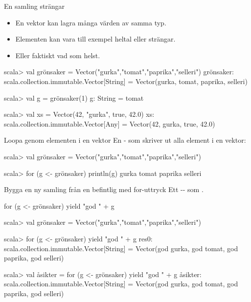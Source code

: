 \begin{Slide}{En samling strängar}

\begin{itemize}
\item En vektor kan lagra många värden av samma typ. 
\item Elementen kan vara till exempel heltal eller strängar. 
\item Eller faktiskt vad som helst. 
\end{itemize}

\begin{REPL}
scala> val grönsaker = Vector("gurka","tomat","paprika","selleri")
grönsaker: scala.collection.immutable.Vector[String] = Vector(gurka, tomat, paprika, selleri)

scala> val g = grönsaker(1)
g: String = tomat

scala> val xs = Vector(42, "gurka", true, 42.0)
xs: scala.collection.immutable.Vector[Any] = Vector(42, gurka, true, 42.0)


\end{REPL}

\end{Slide}


\begin{Slide}{Loopa genom elementen i en vektor}
En - som skriver ut alla element i en vektor:
\begin{REPL}
scala> val grönsaker = Vector("gurka","tomat","paprika","selleri")

scala> for (g <- grönsaker) println(g)
gurka
tomat
paprika
selleri

\end{REPL}

\end{Slide}


\begin{Slide}{Bygga en ny samling från en befintlig med for-uttryck}
Ett -- som .

\begin{Code}[basicstyle=\ttfamily\fontsize{12}{14}\selectfont]
for (g <- grönsaker) yield "god " + g
\end{Code}

\begin{REPL}
scala> val grönsaker = Vector("gurka","tomat","paprika","selleri")

scala> for (g <- grönsaker) yield "god " + g
res0: scala.collection.immutable.Vector[String] = 
  Vector(god gurka, god tomat, god paprika, god selleri)

scala> val åsikter = for (g <- grönsaker) yield "god " + g
åsikter: scala.collection.immutable.Vector[String] = 
  Vector(god gurka, god tomat, god paprika, god selleri)
\end{REPL}

\end{Slide}



